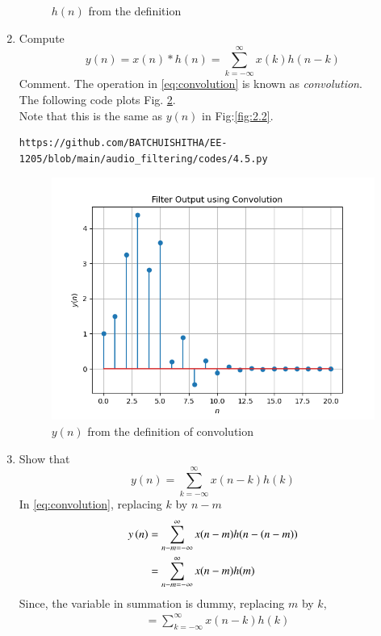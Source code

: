 \documentclass[journal,12pt,twocolumn]{IEEEtran}
\theoremstyle{remark}
\begin{document}
\begin{enumerate}[label=\thesection.\arabic*]
\begin{figure}[ht]
	\caption{$h(n)$ from the definition}
	\label{fig:4.4}
\end{figure}
\item Compute 
\begin{equation}
\label{eq:convolution}
y(n) = x(n)*h(n) = \sum_{k=-\infty}^{\infty}x(k)h(n-k)
\end{equation}
Comment. The operation in \eqref{eq:convolution} is known as
{\em convolution}.\\
\solution The following code plots Fig. \ref{fig:4.5}. \\
Note that this is the same as $y(n)$ in  Fig:\ref{fig:2.2}. 

\begin{lstlisting}
https://github.com/BATCHUISHITHA/EE-1205/blob/main/audio_filtering/codes/4.5.py
\end{lstlisting}
\begin{figure}[ht]
\centering
\includegraphics[width=\columnwidth]{figs/4.5.png}
\caption{$y(n)$ from the definition of convolution}
\label{fig:4.5}
\end{figure}
\newpage
\item Show that
\begin{equation}
y(n) =  \sum_{k=-\infty}^{\infty}x(n-k)h(k)
\end{equation}
\solution
In \eqref{eq:convolution}, replacing $k$ by $n-m$ 
\begin{align}
y\left(n\right) &= \sum_{n-m=-\infty}^{\infty}x(n-m)h(n-(n-m)) \\
 &= \sum_{n-m=-\infty}^{\infty}x(n-m)h(m)
\end{align}
Since, the variable in summation is dummy, replacing $m$ by $k$,
\begin{align}
&= \sum_{k=-\infty}^{\infty}x(n-k)h(k)
\end{align} 
\end{enumerate}
\end{document}
